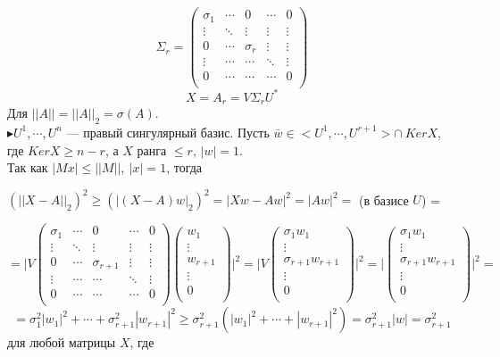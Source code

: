 \documentclass[12pt]{article}
\theoremstyle{definition}
\numberwithin{equation}{section}
\begin{document}
	\[\Sigma_r=\begin{pmatrix}
	\sigma_1 & \cdots & 0  & \cdots & 0\\
	\vdots & \ddots & \vdots & \vdots & \vdots\\
	0 & \cdots & \sigma_r &  \vdots & \vdots\\
	\vdots & \cdots & \cdots & \ddots & \vdots\\
	0 & \cdots & \cdots & \cdots & 0\\
	\end{pmatrix}\]
	$$X=A_r=V\Sigma_r U^*$$
	Для $||A||=||A||_2=\sigma(A)$. \\
	$\blacktriangleright U^1,\cdots, U^n$ --- правый сингулярный базис.
	Пусть $\bar w \in <U^1,\cdots,U^{r+1}> \cap~ Ker X$, где $Ker X \geqslant n-r$, а $X$ ранга $\leqslant r$, $|w|=1$.\\
	Так как $|Mx|\leqslant ||M||,~|x|=1$, тогда \begin{center}
		$(||X-A||_2)^2 \geqslant(|(X-A)w|_2)^2=|Xw-Aw|^2=|Aw|^2=$ (в базисе $U$) =
	\end{center}
	\[=\Bigg| V\begin{pmatrix}
	\sigma_1 & \cdots & 0  & \cdots & 0\\
	\vdots & \ddots & \vdots & \vdots & \vdots\\
	0 & \cdots & \sigma_{r+1} &  \vdots & \vdots\\
	\vdots & \cdots & \cdots & \ddots & \vdots\\
	0 & \cdots & \cdots & \cdots & 0\\
	\end{pmatrix} \begin{pmatrix}
	w_1\\
	\vdots\\
	w_{r+1}\\
	\vdots\\
	0\\
	\end{pmatrix}\Bigg|^2 =\Bigg|V \begin{pmatrix}
	\sigma_1 w_1\\
	\vdots\\
	\sigma_{r+1} w_{r+1}\\
	\vdots\\
	0\\
	\end{pmatrix} \Bigg|^2 =\Bigg| \begin{pmatrix}
	\sigma_1 w_1\\
	\vdots\\
	\sigma_{r+1} w_{r+1}\\
	\vdots\\
	0\\
	\end{pmatrix} \Bigg|^2=\]$$=\sigma_1^2|w_1|^2+\cdots+\sigma_{r+1}^2|w_{r+1}|^2 \geqslant \sigma_{r+1}^2(|w_1|^2+\cdots+|w_{r+1}|^2)=\sigma_{r+1}^2|w|=\sigma_{r+1}^2$$ для любой матрицы $X$, где 
\end{document}
